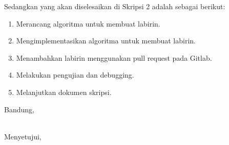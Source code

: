 \documentclass[a4paper,twoside]{article}
\begin{document}
Sedangkan yang akan diselesaikan di Skripsi 2 adalah sebagai berikut:
\begin{enumerate}
\item Merancang algoritma untuk membuat labirin. 
\item Mengimplementasikan algoritma untuk membuat labirin.
\item Menambahkan labirin menggunakan pull request pada Gitlab.
\item Melakukan pengujian dan debugging.
\item Melanjutkan dokumen skripsi.
\end{enumerate}

\vspace{1cm}
\centering Bandung, \tanggal\\
\vspace{2cm} \nama \\ 
\vspace{1cm}

Menyetujui, \\
\end{document}
